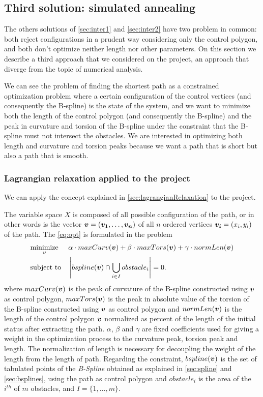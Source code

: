 \documentclass[dissertation.tex]{subfiles}
\begin{document}
\subsection{Third solution: simulated annealing}\label{sec:inter3}
The others solutions of \cref{sec:inter1} and \cref{sec:inter2} have two
problem in common: both reject configurations in a prudent way
considering only the control polygon, and both don't optimize neither
length nor other parameters. On this section we describe a third
approach that we considered on the project, an approach that diverge
from the topic of numerical analysis.

We can see the problem of finding the shortest path as a constrained
optimization problem where a certain configuration of the control
vertices (and
consequently the B-spline) is the state of the system, and we want to
minimize both the length of the control polygon (and consequently the
B-spline) and the peak in curvature and torsion of the B-spline under
the constraint that the B-spline must not intersect the obstacles. We
are interested in optimizing both length and curvature and torsion
peaks because we want a path that is short but also a path that is
smooth.

\subsubsection{Lagrangian relaxation applied to the project}
We can apply the concept explained in \cref{sec:lagrangianRelaxation}
to the project.

The variable space $X$ is composed of all possible
configuration of the path, or in other words is the vector
$\boldsymbol{v}=(\boldsymbol{v_1},\dots,\boldsymbol{v_n})$ of all $n$ ordered
vertices $\boldsymbol{v_i}=(x_i,y_i)$ of the
path. The \cref{eq:opt} is formulated in the problem
\begin{equation*}
  \begin{aligned}
    & \underset{\boldsymbol{v}}{\text{minimize}}
    & & \alpha\cdot maxCurv(\boldsymbol{v})+\beta\cdot
    maxTors(\boldsymbol{v})+\gamma\cdot normLen(\boldsymbol{v}) \\
    & \text{subject to}
    & & \left|bspline(\boldsymbol{v})\cap \bigcup_{i\in I}obstacle_i\right| = 0.
  \end{aligned}
\end{equation*}
where $maxCurv(\boldsymbol{v})$ is the peak of curvature of the B-spline
constructed using $\boldsymbol{v}$ as control polygon,
$maxTors(\boldsymbol{v})$ is the peak in absolute value of the torsion of
the B-spline constructed using $\boldsymbol{v}$ as control polygon and
$normLen(\boldsymbol{v})$ is the length of the control polygon
$\boldsymbol{v}$ normalized as percent of the length of the initial status
after extracting the path. $\alpha$, $\beta$ and $\gamma$ are fixed
coefficients used for giving a weight in the optimization process to
the curvature peak, torsion peak and length. The normalization of
length is necessary for decoupling the weight of the length from the
length of path. Regarding the constraint, $bspline(\boldsymbol{v})$
is the set of tabulated points of the \emph{B-Spline} obtained as
explained in
\cref{sec:spline} and \cref{sec:bsplines}, using the path as
control polygon and
$obstacle_i$ is the area of the $i^{th}$ of $m$ obstacles, and
$I=\{1,\dots,m\}$.
\end{document}
